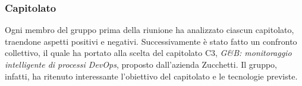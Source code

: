 \subsubsection{Capitolato}
Ogni membro del gruppo prima della riunione ha analizzato ciascun capitolato, traendone aspetti positivi e negativi. Successivamente è stato fatto un confronto collettivo, il quale ha portato alla scelta del capitolato C3, \emph{G\&B: monitoraggio intelligente di processi DevOps}, proposto dall'azienda Zucchetti. Il gruppo, infatti, ha ritenuto interessante l'obiettivo del capitolato e le tecnologie previste.
